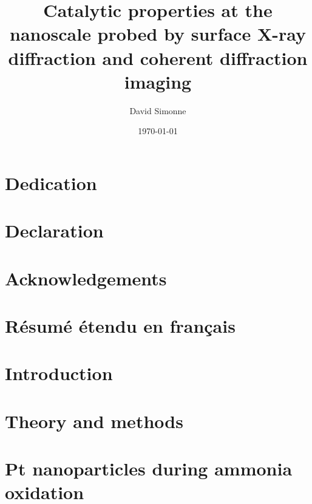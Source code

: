 \documentclass[11pt]{report}
\title{Catalytic properties at the nanoscale probed by surface X-ray diffraction and coherent diffraction imaging}
\author{David Simonne}
\date{\today}
\begin{document}
    
    \newpage
    

        \chapter*{Dedication}
        
        \chapter*{Declaration}
        
        \chapter*{Acknowledgements}
        
        \chapter*{Résumé étendu en français}
        

    \frontmatter
    {\hypersetup{linkcolor=black}
        \tableofcontents
    }
    \newpage

    \mainmatter
    \chapter{Introduction}
    
     
    \chapter{Theory and methods}
    
    
    
    
    
    
    

    \chapter{Pt nanoparticles during ammonia oxidation}
    
    
    
    
    
\end{document}
